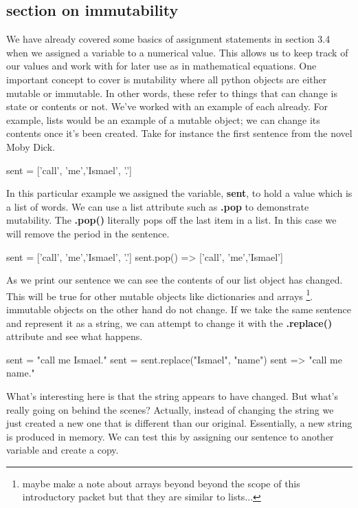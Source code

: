 

\subsection{section on immutability}

We have already covered some basics of assignment statements in section 3.4 when we assigned a variable to a numerical value. This allows us to keep track of our values and work with for later use as in mathematical equations. 
One important concept to cover is mutability where all python objects are either mutable or immutable. In other words, these refer to things that can change is state or contents or not. We've worked with an example of each already. For example, lists would be an example of a mutable object; we can change its contents once it's been created. Take for instance the first sentence from the novel Moby Dick. 

\begin{python}
sent = ['call', 'me','Ismael', '.']
\end{python}

In this particular example we assigned the variable, \textbf{sent}, to hold a value which is a list of words. We can use a list attribute such as \textbf{.pop} to demonstrate mutability. The \textbf{.pop()} literally pops off the last item in a list. In this case we will remove the period in the sentence. 
\begin{python}
sent = ['call', 'me','Ismael', '.']
sent.pop()
=> ['call', 'me','Ismael']
\end{python}

As we print our sentence we can see the contents of our list object has changed. This will be true for other mutable objects like dictionaries and arrays \footnote{maybe make a note about arrays beyond beyond the scope of this introductory packet but that they are similar to lists...}. immutable objects on the other hand do not change. If we take the same sentence and represent it as a string, we can attempt to change it with the \textbf{.replace()} attribute and see what happens. 

\begin{python}
sent = "call me Ismael."
sent = sent.replace("Ismael", "name")
sent
=> "call me name."
\end{python}

What's interesting here is that the string appears to have changed. But what's really going on behind the scenes? Actually, instead of changing the string we just created a new one that is different than our original. Essentially, a new string is produced in memory. We can test this by assigning our sentence to another variable and create a copy.

